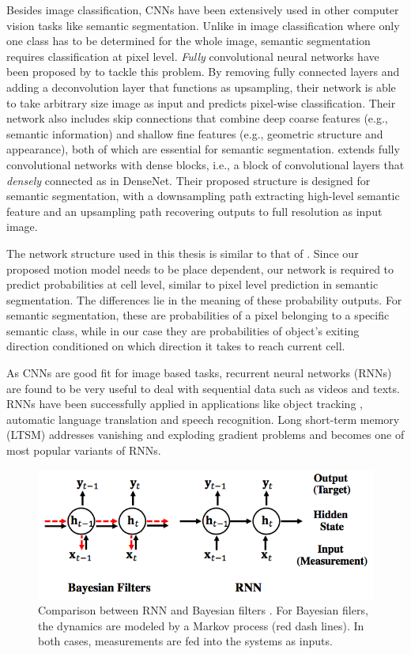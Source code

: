 Besides image classification, CNNs have been extensively used in other computer vision tasks like semantic segmentation. Unlike in image classification where only one class has to be determined for the whole image, semantic segmentation requires  classification at pixel level. \textit{Fully} convolutional neural networks have been proposed by \cite{long2015fully} to tackle this problem. By removing fully connected layers and adding a deconvolution layer that functions as upsampling, their network is able to take arbitrary size image as input and predicts pixel-wise classification. Their network also includes skip connections that combine deep coarse features (e.g., semantic information) and shallow fine features (e.g., geometric structure and appearance), both of which are essential for semantic segmentation. \citet{jegou2017one} extends fully convolutional networks with dense blocks, i.e., a block of convolutional layers that \textit{densely} connected as in DenseNet. Their proposed structure is designed for semantic segmentation, with a downsampling path extracting high-level semantic feature and an upsampling path recovering outputs to full resolution as input image. 

The network structure used in this thesis is similar to that of \citet{jegou2017one}. Since our proposed motion model needs to be place dependent, our network is required to predict probabilities at cell level, similar to pixel level prediction in semantic segmentation. The differences lie in the meaning of these probability outputs. For semantic segmentation, these are probabilities of a pixel belonging to a specific semantic class, while in our case they are probabilities of object's exiting direction conditioned on which direction it takes to reach current cell.   

As CNNs are good fit for image based tasks, recurrent neural networks (RNNs) are found to be very useful to deal with sequential data such as videos and texts. RNNs have been successfully applied in applications like object tracking \citep{ondruska2016deep}, automatic language translation \citep{cho2014learning} and speech recognition\citep{graves2013speech}. Long short-term memory (LTSM) \citep{hochreiter1997long} addresses vanishing and exploding gradient problems and becomes one of most popular variants of RNNs. 

\begin{figure}[ht]
  \centering
    \includegraphics[width=.7\textwidth]{figures/rnn_and_bayes.png}
    \caption[Comparison between RNN and Bayesian filters.]{Comparison between RNN and Bayesian filters \citep{de2017dynamic}. For Bayesian filers, the dynamics are modeled by a Markov process (red dash lines). In both cases, measurements are fed into the systems as inputs.}
    \label{fig:rnn_and_bayes}
\end{figure} 

